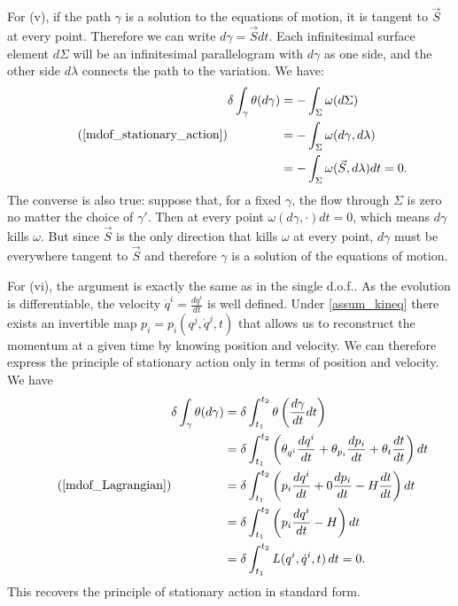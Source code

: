 \documentclass[10pt,twocolumn, nofootinbib]{revtex4-2}
\begin{document}
For (v), if the path $\gamma$ is a solution to the equations of motion, it is tangent to $\vec{S}$ at every point. Therefore we can write $d\gamma= \vec{S} dt$. Each infinitesimal surface element $d\Sigma$ will be an infinitesimal parallelogram with $d\gamma$ as one side, and the other side $d\lambda$ connects the path to the variation. We have:
\begin{equation}
\tag*{(\ref{mdof_stationary_action})}
\begin{aligned}
	\delta \int_{\gamma} \theta (d\gamma) &= -\int_\Sigma \omega(d\Sigma) \\
	&= -\int_\Sigma \omega(d\gamma, d\lambda) \\
	&= -\int_\Sigma \omega(\vec{S}, d\lambda) dt = 0.
\end{aligned}
\end{equation}
The converse is also true: suppose that, for a fixed $\gamma$, the flow through $\Sigma$ is zero no matter the choice of $\gamma'$. Then at every point $\omega(d\gamma, \cdot) dt = 0$, which means $d\gamma$ kills $\omega$. But since $\vec{S}$ is the only direction that kills $\omega$ at every point, $d\gamma$ must be everywhere tangent to $\vec{S}$ and therefore $\gamma$ is a solution of the equations of motion.

For (vi), the argument is exactly the same as in the single d.o.f.. As the evolution is differentiable, the velocity $\dot{q}^i = \frac{dq^i}{dt}$ is well defined. Under \ref{assum_kineq} there exists an invertible map $p_i=p_i(q^j, \dot{q}^j, t)$ that allows us to reconstruct the momentum at a given time by knowing position and velocity. We can therefore express the principle of stationary action only in terms of position and velocity. We have
\begin{equation}
\tag*{(\ref{mdof_Lagrangian})}
	\begin{aligned}
		\delta \int_\gamma \theta (d\gamma) &= \delta \int^{t_2}_{t_1} \theta \left(\frac{d\gamma}{dt} dt\right) \\
		&= \delta \int^{t_2}_{t_1} \left(\theta_{q^i} \frac{dq^i}{dt} + \theta_{p_i} \frac{dp_i}{dt} + \theta_t \frac{dt}{dt}\right) dt \\
		&= \delta\int^{t_2}_{t_1} \left(p_i \frac{dq^i}{dt} + 0 \frac{dp_i}{dt} - H \frac{dt}{dt}\right) dt \\
		&= \delta \int^{t_2}_{t_1} \left(p_i \frac{dq^i}{dt} - H\right) dt \\
		&= \delta \int^{t_2}_{t_1} L(q^i, \dot{q}^i, t) \, dt = 0.
	\end{aligned}
\end{equation}
This recovers the principle of stationary action in standard form.
\end{document}
